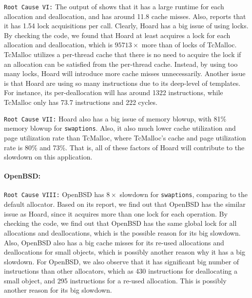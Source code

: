  \texttt{Root Cause \RN{6}:}
 The output of \MP{} shows that it has a large runtime for each allocation and deallocation, and has around 11.8 cache misses. Also, \MP{} reports that it has 1.54 lock acquisitions per call. Clearly, Hoard has a big issue of using locks. By checking the code, we found that Hoard at least acquires a lock for each allocation and deallocation, which is $95713\times$ more than of locks of TcMalloc. TcMalloc utilizes a per-thread cache that there is no need to acquire the lock if an allocation can be satisfied from the per-thread cache. Instead, by using too many locks, Hoard will introduce more cache misses unnecessarily. Another issue is that Hoard are using so many instructions due to its deep-level of templates. For instance, its per-deallocation will has around 1322 instructions, while TcMalloc only has 73.7 instructions and 222 cycles.  
 
 \texttt{Root Cause \RN{7}:} Hoard also has a big issue of memory blowup, with 81\% memory blowup for \texttt{swaptions}. Also, it also much lower cache utilization and page utilization rate than TcMalloc, where TcMalloc's cache and page utilization rate is 80\% and 73\%. That is, all of these factors of Hoard will contribute to the slowdown on this application.
 
\paragraph{OpenBSD:} \texttt{Root Cause \RN{8}:}  OpenBSD has $8\times$ slowdown for \texttt{swaptions}, comparing to the default allocator. Based on its report, we find out that OpenBSD has the similar issue as Hoard, since it acquires more than one lock for each operation. By checking the code, we find out that OpenBSD has the same global lock for all allocations and deallocations, which is the possible reason for its big slowdown. Also, OpenBSD also has a big cache misses for its re-used allocations and deallocations for small objects, which is possibly another reason why it has a big slowdown. For OpenBSD, we also observe that it has significant big number of instructions than other allocators, which as 430 instructions for deallocating a small object, and 295 instructions for a re-used allocation. This is possibly another reason for its big slowdown. 








